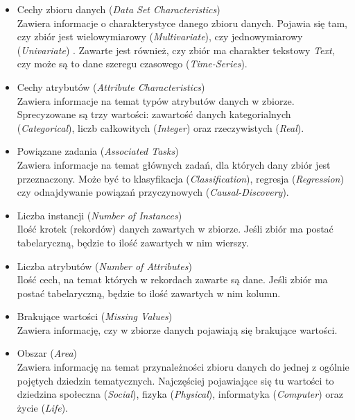 \begin{itemize}
  \item Cechy zbioru danych (\emph{Data Set Characteristics}) \\
        Zawiera informacje o charakterystyce danego zbioru danych.
        Pojawia się tam, czy zbiór jest wielowymiarowy (\emph{Multivariate}), czy jednowymiarowy (\emph{Univariate}) \footnotemark.
        Zawarte jest również, czy zbiór ma charakter tekstowy \emph{Text}, czy może są to dane szeregu czasowego (\emph{Time-Series}).

  \item Cechy atrybutów (\emph{Attribute Characteristics}) \\
        Zawiera informacje na temat typów atrybutów danych w zbiorze.
        Sprecyzowane są trzy wartości: zawartość danych kategorialnych (\emph{Categorical}), liczb całkowitych (\emph{Integer}) oraz rzeczywistych (\emph{Real}).

  \item Powiązane zadania (\emph{Associated Tasks}) \\
        Zawiera informacje na temat głównych zadań, dla których dany zbiór jest przeznaczony.
        Może być to klasyfikacja (\emph{Classification}), regresja (\emph{Regression}) czy odnajdywanie powiązań przyczynowych (\emph{Causal-Discovery}).

  \item Liczba instancji (\emph{Number of Instances}) \\
        Ilość krotek (rekordów) danych zawartych w zbiorze.
        Jeśli zbiór ma postać tabelaryczną, będzie to ilość zawartych w nim wierszy.

  \item Liczba atrybutów (\emph{Number of Attributes}) \\
        Ilość cech, na temat których w rekordach zawarte są dane.
        Jeśli zbiór ma postać tabelaryczną, będzie to ilość zawartych w nim kolumn.

  \item Brakujące wartości (\emph{Missing Values}) \\
        Zawiera informację, czy w zbiorze danych pojawiają się brakujące wartości.

  \item Obszar (\emph{Area}) \\
        Zawiera informację na temat przynależności zbioru danych do jednej z ogólnie pojętych dziedzin tematycznych.
        Najczęściej pojawiające się tu wartości to dziedzina społeczna (\emph{Social}), fizyka (\emph{Physical}), informatyka (\emph{Computer}) oraz życie (\emph{Life}).


\end{itemize}
